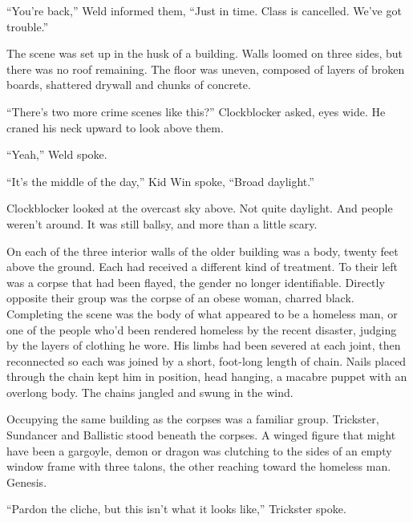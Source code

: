 ``You're back,'' Weld informed them, ``Just in time.  Class is cancelled.  We've got trouble.''



\sectionbreak



The scene was set up in the husk of a building.  Walls loomed on three sides, but there was no roof remaining.  The floor was uneven, composed of layers of broken boards, shattered drywall and chunks of concrete.



``There's two more crime scenes like this?'' Clockblocker asked, eyes wide.  He craned his neck upward to look above them.



``Yeah,'' Weld spoke.



``It's the middle of the day,'' Kid Win spoke, ``Broad daylight.''



Clockblocker looked at the overcast sky above.  Not quite daylight. And people weren't around.  It was still ballsy, and more than a little scary.



On each of the three interior walls of the older building was a body, twenty feet above the ground.  Each had received a different kind of treatment.  To their left was a corpse that had been flayed, the gender no longer identifiable.  Directly opposite their group was the corpse of an obese woman, charred black.  Completing the scene was the body of what appeared to be a homeless man, or one of the people who'd been rendered homeless by the recent disaster, judging by the layers of clothing he wore.  His limbs had been severed at each joint, then reconnected so each was joined by a short, foot-long length of chain.  Nails placed through the chain kept him in position, head hanging, a macabre puppet with an overlong body.  The chains jangled and swung in the wind.



Occupying the same building as the corpses was a familiar group.  Trickster, Sundancer and Ballistic stood beneath the corpses.  A winged figure that might have been a gargoyle, demon or dragon was clutching to the sides of an empty window frame with three talons, the other reaching toward the homeless man.  Genesis.



``Pardon the cliche, but this isn't what it looks like,'' Trickster spoke.



